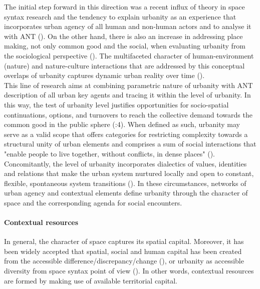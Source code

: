 \documentclass[11pt]{report}
\begin{document}
The initial step forward in this direction was a recent influx of theory in space syntax research and the tendency to explain urbanity as an experience that incorporates urban agency of all human and non-human actors and to analyse it with ANT (\cite{(Rheintantz 2012)}).
On the other hand, there is also an increase in addressing place making, not only common good and the social, when evaluating urbanity from the sociological perspective (\cite{Holden et al. 2015}). 
The multifaceted character of human-environment (nature) and nature-culture interactions that are addressed by this conceptual overlaps of urbanity captures dynamic urban reality over time (\cite{(Tardin 2014)}).
\\

This line of research aims at combining parametric nature of urbanity with ANT description of all urban key agents and tracing it within the level of urbanity. In this way, the test of urbanity level justifies opportunities for socio-spatial continuations, options, and turnovers to reach the collective demand towards the common good in the public sphere (\cite{(Holden et al. 2015}:4). 
When defined as such, urbanity may serve as a valid scope that offers categories for restricting complexity towards a structural unity of urban elements and comprises a sum of social interactions that "enable people  to  live  together,  without  conflicts,  in  dense places"
(\cite{Bisson 2016; Monnet, 1999, in Dorrier-Apprill, 2001}).
Concomitantly, the level of urbanity incorporates dialectics of values, identities and relations that make the urban system nurtured locally and open to constant, flexible, spontaneous system transitions (\cite{(Groth and Corijn 2005)}).
In these circumstances, networks of urban agency and contextual elements define urbanity through the character of space and the corresponding agenda for social encounters.

\paragraph{Contextual resources}

In general, the character of space captures its spatial capital. 
Moreover, it has been widely accepted that spatial, social and human capital has been created from the accessible difference/discrepancy/change (\cite{(Becker 1964; Coleman 1988)}), or urbanity as accessible diversity from space syntax point of view (\cite{Marcus 2007}). In other words, contextual resources are formed by making use of available territorial capital.
\\
\end{document}

